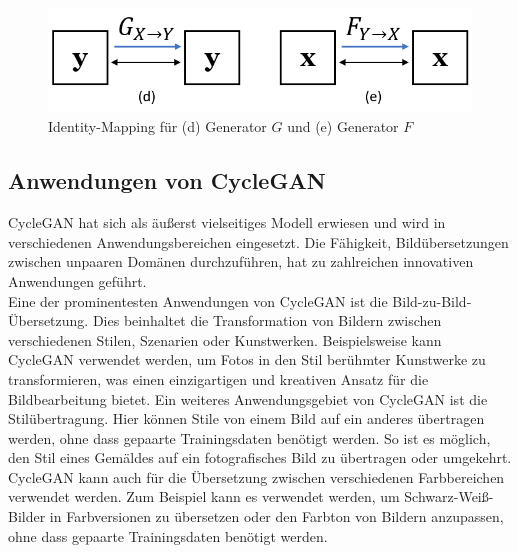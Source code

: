 \begin{figure}[h]
	\centering
	\includegraphics[width=0.7\linewidth]{./images/identity_loss.png}
	\caption{Identity-Mapping für (d) Generator $G$ und (e) Generator $F$}
	\label{fig:IdentityMapping}
\end{figure}


\subsection{Anwendungen von CycleGAN}
CycleGAN hat sich als äußerst vielseitiges Modell erwiesen und wird in verschiedenen Anwendungsbereichen eingesetzt. Die Fähigkeit, Bildübersetzungen zwischen unpaaren Domänen durchzuführen, hat zu zahlreichen innovativen Anwendungen geführt.
\\
Eine der prominentesten Anwendungen von CycleGAN ist die Bild-zu-Bild-\\Übersetzung. Dies beinhaltet die Transformation von Bildern zwischen verschiedenen Stilen, Szenarien oder Kunstwerken. Beispielsweise kann CycleGAN verwendet werden, um Fotos in den Stil berühmter Kunstwerke zu transformieren, was einen einzigartigen und kreativen Ansatz für die Bildbearbeitung bietet.
Ein weiteres Anwendungsgebiet von CycleGAN ist die Stilübertragung. Hier können Stile von einem Bild auf ein anderes übertragen werden, ohne dass gepaarte Trainingsdaten benötigt werden. So ist es möglich, den Stil eines Gemäldes auf ein fotografisches Bild zu übertragen oder umgekehrt. CycleGAN kann auch für die Übersetzung zwischen verschiedenen Farbbereichen verwendet werden. Zum Beispiel kann es verwendet werden, um Schwarz-Weiß-Bilder in Farbversionen zu übersetzen oder den Farbton von Bildern anzupassen, ohne dass gepaarte Trainingsdaten benötigt werden.
